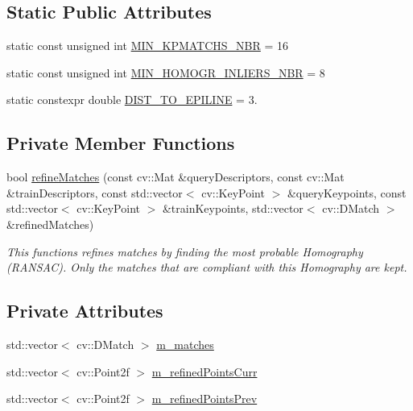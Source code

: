 \subsection*{Static Public Attributes}
\begin{DoxyCompactItemize}
\item 
static const unsigned int \hyperlink{classkpproc_1_1KpointMatcher_a35b716145fb33b20b3ca2bfec10e343e}{M\+I\+N\+\_\+\+K\+P\+M\+A\+T\+C\+H\+S\+\_\+\+N\+BR} = 16
\item 
static const unsigned int \hyperlink{classkpproc_1_1KpointMatcher_a4d0c0de93ab29378a504265e263663f6}{M\+I\+N\+\_\+\+H\+O\+M\+O\+G\+R\+\_\+\+I\+N\+L\+I\+E\+R\+S\+\_\+\+N\+BR} = 8
\item 
static constexpr double \hyperlink{classkpproc_1_1KpointMatcher_a1efd51083ded96127c34697340e5e92e}{D\+I\+S\+T\+\_\+\+T\+O\+\_\+\+E\+P\+I\+L\+I\+NE} = 3.
\end{DoxyCompactItemize}
\subsection*{Private Member Functions}
\begin{DoxyCompactItemize}
\item 
bool \hyperlink{classkpproc_1_1KpointMatcher_a0d1681f55cfeea8a51bba9ccac41d346}{refine\+Matches} (const cv\+::\+Mat \&query\+Descriptors, const cv\+::\+Mat \&train\+Descriptors, const std\+::vector$<$ cv\+::\+Key\+Point $>$ \&query\+Keypoints, const std\+::vector$<$ cv\+::\+Key\+Point $>$ \&train\+Keypoints, std\+::vector$<$ cv\+::\+D\+Match $>$ \&refined\+Matches)
\begin{DoxyCompactList}\small\item\em This functions refines matches by finding the most probable Homography (R\+A\+N\+S\+AC). Only the matches that are compliant with this Homography are kept. \end{DoxyCompactList}\end{DoxyCompactItemize}
\subsection*{Private Attributes}
\begin{DoxyCompactItemize}
\item 
std\+::vector$<$ cv\+::\+D\+Match $>$ \hyperlink{classkpproc_1_1KpointMatcher_a082b2988b8e0381f2286dcaa1725a8db}{m\+\_\+matches}
\item 
std\+::vector$<$ cv\+::\+Point2f $>$ \hyperlink{classkpproc_1_1KpointMatcher_a9a0c678dccf356d72b2a69542bcfe960}{m\+\_\+refined\+Points\+Curr}
\item 
std\+::vector$<$ cv\+::\+Point2f $>$ \hyperlink{classkpproc_1_1KpointMatcher_ad21af067c2a5fa339aba9abe85fa943a}{m\+\_\+refined\+Points\+Prev}
\end{DoxyCompactItemize}



